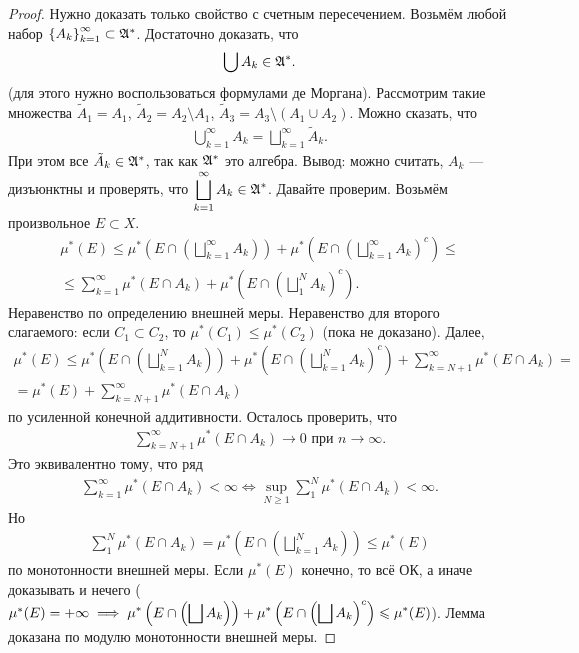 \documentclass[a4paper,14pt]{extarticle}
\theoremstyle{definition}
\theoremstyle{plain}
\theoremstyle{plain}
\theoremstyle{plain}
\theoremstyle{plain}
\theoremstyle{definition}
\theoremstyle{definition}
\theoremstyle{definition}
\theoremstyle{definition}
\theoremstyle{definition}
\theoremstyle{definition}
\theoremstyle{plain}
\theoremstyle{plain}
\theoremstyle{plain}
\theoremstyle{plain}
\theoremstyle{definition}
\theoremstyle{definition}
\theoremstyle{definition}
\theoremstyle{definition}
\theoremstyle{definition}
\newcommand{\then}{\ensuremath \implies}
\newcommand{\A}{\ensuremath \mathfrak{A}}
\begin{document}
\begin{proof}
 Нужно доказать только свойство с счетным пересечением. Возьмём любой набор $ \left\{ A_k \right\}_{k=1}^\infty \subset \A^\ast $. Достаточно доказать, что
 \begin{align*}
  \bigcup A_k \in \A^\ast
  .\end{align*} (для этого нужно воспользоваться формулами де Моргана). Рассмотрим такие множества $ \tilde A_1 = A_1 $, $ \tilde A_2 = A_2 \setminus A_1 $, $ \tilde A_3 = A_3 \setminus (A_1 \cup A_2)$. Можно сказать, что
 \begin{align*}
  \bigcup_{k=1}^\infty A_k = \bigsqcup_{k=1}^\infty \tilde A_k
  .\end{align*} При этом все $ \tilde A_k \in \A^\ast $, так как $ \A^\ast $ это алгебра. Вывод: можно считать, $ A_k $ --- дизъюнктны и проверять, что $ \displaystyle \bigsqcup_{k=1}^\infty A_k \in \A^\ast $. Давайте проверим. Возьмём произвольное $ E \subset X $.
 \begin{align*}
  \mu^\ast(E) \leqslant \mu^\ast\left( E \cap \left( \bigsqcup_{k=1}^\infty A_k \right) \right) + \mu^\ast\left( E \cap \left( \bigsqcup_{k=1}^\infty A_k \right)^c \right) \leqslant \\
  \leqslant \sum_{k=1}^{\infty} \mu^\ast(E \cap A_k) + \mu^\ast\left( E \cap \left( \bigsqcup_1^N A_k \right)^c \right)
  .\end{align*} Неравенство по определению внешней меры. Неравенство для второго слагаемого: если $ C_1 \subset C_2 $, то $ \mu^\ast(C_1) \leqslant \mu^\ast(C_2) $ (пока не доказано).
 Далее,
 \begin{align*}
  \mu^\ast(E) \leqslant \mu^\ast\left( E \cap \left( \bigsqcup_{k=1}^N A_k \right) \right) + \mu^\ast\left( E \cap \left( \bigsqcup_{k=1}^N A_k \right)^c\right) + \sum_{k=N+1}^{\infty} \mu^\ast(E \cap A_k) = \\
  = \mu^\ast(E) + \sum_{k=N+1}^{\infty} \mu^\ast(E \cap A_k)
 \end{align*} по усиленной конечной аддитивности. Осталось проверить, что
 \begin{align*}
  \sum_{k=N+1}^{\infty} \mu^\ast(E \cap A_k) \to 0 \text{ при } n \to \infty
  .\end{align*} Это эквивалентно тому, что ряд
 \begin{align*}
  \sum_{k=1}^{\infty}  \mu^\ast (E \cap A_k) < \infty \iff \sup_{N \geqslant 1} \sum_1^N \mu^\ast(E \cap A_k) < \infty
  .\end{align*} Но
 \begin{align*}
  \sum_{1}^{N} \mu^\ast(E \cap A_k) = \mu^\ast\left(E \cap \left(\bigsqcup_{k=1}^N A_k\right)\right) \leqslant \mu^\ast(E)
 \end{align*} по монотонности внешней меры. Если $ \mu^\ast(E) $ конечно, то всё ОК, а иначе доказывать и нечего ($ \mu^\ast(E) = +\infty \then \displaystyle \mu^\ast\left(E \cap \left( \bigsqcup A_k \right)\right)  + \mu^\ast\left(E \cap \left( \bigsqcup A_k \right)^c\right) \leqslant \mu^\ast(E)$). Лемма доказана по модулю монотонности внешней меры.
\end{proof}
\end{document}
